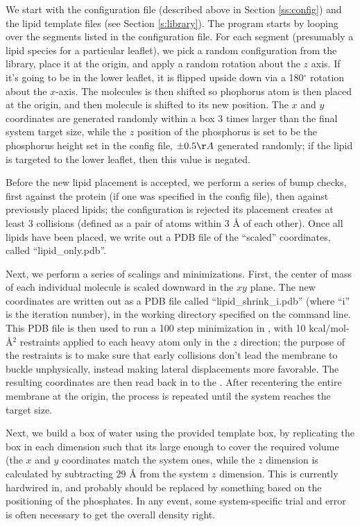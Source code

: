 \documentclass[12pt]{article}
\begin{document}
We start with the configuration file (described above in Section
\ref{ss:config}) and the lipid template files (see Section \ref{s:library}).
The program starts by looping over the segments listed in the configuration
file.  For each segment (presumably a lipid species for a particular
leaflet), we pick a random configuration from the library, place it at the
origin, and apply a random rotation about the $z$ axis.  If it's going to be
in the lower leaflet, it is flipped upside down via a 180$^\circ$ rotation
about the $x$-axis.  The molecules is then shifted so phophorus atom is then
placed at the origin, and then molecule is shifted to its new position.  The
$x$ and $y$ coordinates are generated randomly within a box 3 times larger
than the final system target size, while the $z$ position of the phosphorus
is set to be the phosphorus height set in the config file, $\pm 0.5 \AA$
generated randomly; if the lipid is targeted to the lower leaflet, then this
value is negated.  

Before the new lipid placement is accepted, we perform a series of bump
checks, first against the protein (if one was specified in the config file),
then against previously placed lipids; the configuration is rejected its
placement creates at least 3 collisions (defined as a pair of atoms within 3
{\AA} of each other).  Once all lipids have been placed, we write out a PDB
file of the ``scaled'' coordinates, called ``lipid\_only.pdb''.  

Next, we perform a series of scalings and minimizations.  First, the center
of mass of each individual molecule is scaled downward in the $xy$ plane.
The new coordinates are written out as a PDB file called
``lipid\_shrink\_i.pdb'' (where ``i'' is the iteration number), in the
working directory specified on the command line.  This PDB file is then used
to run a 100 step minimization in \namd, with 10 kcal/mol-{\AA}$^2$
restraints applied to each heavy atom only in the $z$ direction; the purpose
of the restraints is to make sure that early collisions don't lead the
membrane to buckle unphysically, instead making lateral displacements more
favorable.  The resulting coordinates are then read back in to the \omgwtf.
After recentering the entire membrane at the origin, the process is repeated
until the system reaches the target size.

Next, we build a box of water using the provided template box, by replicating
the box in each dimension such that its large enough to cover the required
volume (the $x$ and $y$ coordinates match the system ones, while the $z$
dimension is calculated by subtracting 29 {\AA} from the system $z$
dimension.  This is currently hardwired in, and probably should be replaced
by something based on the positioning of the phosphates.  In any event, some
system-specific trial and error is often necessary to get the overall density
right.
\end{document}
